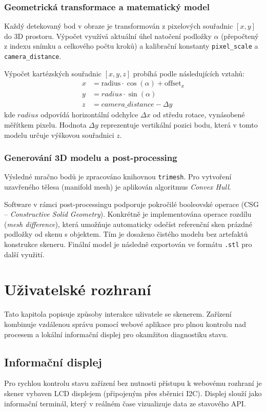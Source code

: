 \documentclass[12pt,a4paper]{report}
\begin{document}
\subsection{Geometrická transformace a matematický model}
Každý detekovaný bod v obraze je transformován z pixelových souřadnic $[x, y]$ do 3D prostoru. Výpočet využívá aktuální úhel natočení podložky $\alpha$ (přepočtený z indexu snímku a celkového počtu kroků) a kalibrační konstanty \texttt{pixel\_scale} a \texttt{camera\_distance}.

Výpočet kartézských souřadnic $[x, y, z]$ probíhá podle následujících vztahů:
\begin{align*}
    x &= \text{radius} \cdot \cos(\alpha) + \text{offset}_x \\
    y &= radius \cdot \sin(\alpha) \\
    z &= camera\_distance - \Delta y
\end{align*}
kde $radius$ odpovídá horizontální odchylce $\Delta x$ od středu rotace, vynásobené měřítkem pixelu. Hodnota $\Delta y$ reprezentuje vertikální pozici bodu, která v tomto modelu určuje výškovou souřadnici $z$.

\subsection{Generování 3D modelu a post-processing}
Výsledné mračno bodů je zpracováno knihovnou \texttt{trimesh}. Pro vytvoření uzavřeného tělesa (manifold mesh) je aplikován algoritmus \textit{Convex Hull}. 

Software v rámci post-processingu podporuje pokročilé booleovské operace (CSG – \textit{\mbox{Constructive} Solid Geometry}). Konkrétně je implementována operace rozdílu (\textit{mesh \mbox{difference}}), která umožňuje automaticky odečíst referenční sken prázdné podložky od skenu s objektem. Tím je dosaženo čistého modelu bez artefaktů konstrukce skeneru. Finální model je následně exportován ve formátu \texttt{.stl} pro další využití.
\chapter{Uživatelské rozhraní}
Tato kapitola popisuje způsoby interakce uživatele se skenerem. Zařízení kombinuje \mbox{vzdálenou} správu pomocí webové aplikace pro plnou kontrolu nad procesem a lokální informační displej pro okamžitou diagnostiku stavu.
\section{Informační displej}
Pro rychlou kontrolu stavu zařízení bez nutnosti přístupu k webovému rozhraní je \mbox{skener} \mbox{vybaven} LCD displejem (připojeným přes sběrnici I2C). Displej slouží jako informační terminál, který v reálném čase vizualizuje data ze stavového API.
\end{document}
